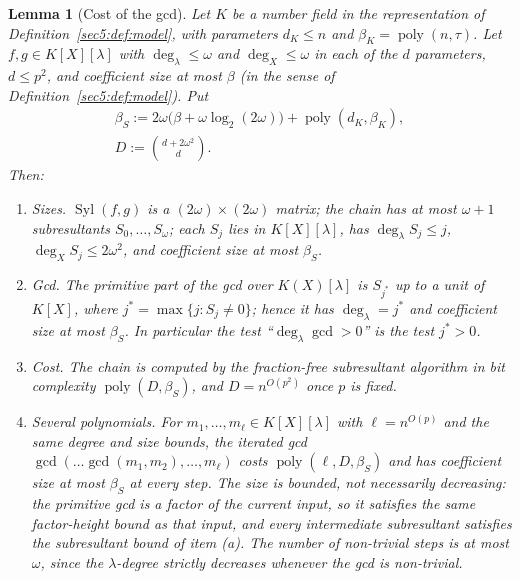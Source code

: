 \documentclass[journal]{IEEEtran}
\theoremstyle{plainn}
\newtheorem{lem}[thm]{Lemma}
\theoremstyle{remark}
\newcommand{\poly}{\operatorname{poly}}
\begin{document}
\begin{lem}[Cost of the gcd]\label{sec5:sub:subres}\label{sec5:lem:subres}\label{sec5:lem:multigcd}
Let $K$ be a number field in the representation of Definition~\ref{sec5:def:model}, with parameters
$d_K\le n$ and $\beta_K=\poly(n,\tau)$. Let $f,g\in K[X][\lambda]$ with $\deg_\lambda\le\omega$ and
$\deg_X\le\omega$ in each of the $d$ parameters, $d\le p^{2}$, and coefficient size at most $\beta$ (in
the sense of Definition~\ref{sec5:def:model}). Put
\begin{equation}\label{sec5:eq:sizes}
\begin{gathered}
\beta_S:=2\omega\bigl(\beta+\omega\log_2(2\omega)\bigr)+\poly(d_K,\beta_K),\\
D:=\binom{d+2\omega^{2}}{d}.
\end{gathered}
\end{equation}
Then:
\begin{enumerate}[label=(\alph*),leftmargin=*]
\item \emph{Sizes.} $\operatorname{Syl}(f,g)$ is a $(2\omega)\times(2\omega)$ matrix; the chain has at
most $\omega+1$ subresultants $S_0,\dots,S_\omega$; each $S_j$ lies in $K[X][\lambda]$, has
$\deg_\lambda S_j\le j$, $\deg_X S_j\le 2\omega^{2}$, and coefficient size at most $\beta_S$.
\item \emph{Gcd.} The primitive part of the gcd over $K(X)[\lambda]$ is $S_{j^{*}}$ up to a unit of
$K[X]$, where $j^{*}=\max\{j:S_j\neq0\}$; hence it has $\deg_\lambda=j^{*}$ and coefficient size at
most $\beta_S$. In particular the test ``$\deg_\lambda\gcd>0$'' is the test $j^{*}>0$.
\item \emph{Cost.} The chain is computed by the fraction-free subresultant algorithm in bit complexity
$\poly(D,\beta_S)$, and $D=n^{O(p^{2})}$ once $p$ is fixed.
\item \emph{Several polynomials.} For $m_1,\dots,m_\ell\in K[X][\lambda]$ with $\ell=n^{O(p)}$ and the
same degree and size bounds, the iterated gcd $\gcd(\dots\gcd(m_1,m_2),\dots,m_\ell)$ costs
$\poly(\ell,D,\beta_S)$ and has coefficient size at most $\beta_S$ at every step. The size is
\emph{bounded}, not necessarily decreasing: the primitive gcd is a factor of the current input, so it
satisfies the same factor-height bound as that input, and every intermediate subresultant satisfies the
subresultant bound of item (a). The number of non-trivial steps is at most $\omega$, since the
$\lambda$-degree strictly decreases whenever the gcd is non-trivial.
\end{enumerate}
\end{lem}
\end{document}
